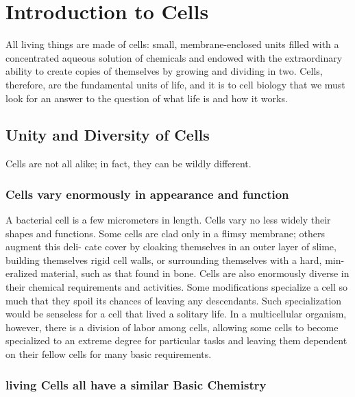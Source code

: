 \chapter{Introduction to Cells}

All living things are made of cells: small, membrane-enclosed units
filled with a concentrated aqueous solution of chemicals and endowed
with the extraordinary ability to create copies of themselves by growing
and dividing in two.
Cells, therefore, are the fundamental units of life, and it is to cell biology
that we must look for an answer to the question of what life is and how it
works.

\section{Unity and Diversity of Cells}

Cells are not all alike; in fact, they can be wildly different.

\subsection{Cells vary enormously in appearance and function}

A bacterial cell is a few micrometers in length. Cells vary no less widely
their shapes and functions.
Some cells are clad only in a flimsy membrane; others augment this deli-
cate cover by cloaking themselves in an outer layer of slime, building
themselves rigid cell walls, or surrounding themselves with a hard, min-
eralized material, such as that found in bone.
Cells are also enormously diverse in their chemical requirements and
activities.
Some modifications specialize a cell so much that they spoil its chances
of leaving any descendants. Such specialization would be senseless for a
cell that lived a solitary life. In a multicellular organism, however, there is
a division of labor among cells, allowing some cells to become specialized
to an extreme degree for particular tasks and leaving them dependent on
their fellow cells for many basic requirements.

\subsection{living Cells all have a similar Basic Chemistry}

